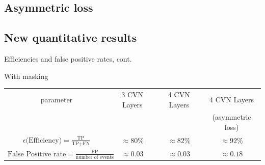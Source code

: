 \subsection{Asymmetric loss}

\subsection {New quantitative results}
\begin{frame}{Efficiencies and false positive rates, cont.}
\begin{table}[]
\centering
    {\Large With masking} \\
    \vspace{.5em}
\begin{tabular}{cccc}
    parameter & 3 CVN Layers & 4 CVN Layers & 4 CVN Layers \\
              &              &              & (asymmetric loss) \\ [0.3em]
    $ \epsilon \textrm{(Efficiency)} = \frac{\mbox{TP}}{\mbox{TP} + \mbox{FN}} $ &  $ \approx 80\% $  & $ \approx 82\% $ & $ \approx 92\% $ \\ [0.7em]
    $ \textrm{False Positive rate} = \frac{\mbox{FP}}{\mbox{number of events}} $ &  $\approx 0.03  $  & $\approx 0.03  $ & $ \approx 0.18 $ \\
 \end{tabular}
\end{table}
\end{frame}
